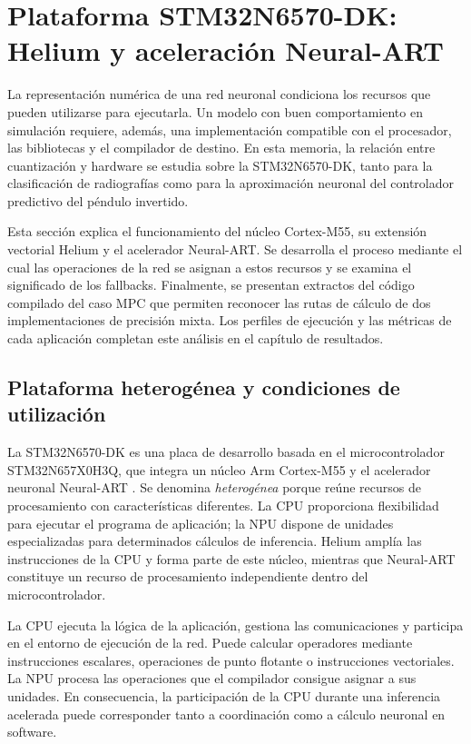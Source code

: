 \section{Plataforma STM32N6570-DK: Helium y aceleración Neural-ART}\label{cap:hw}\label{cap:plataforma}
La representación numérica de una red neuronal condiciona los recursos que pueden utilizarse para ejecutarla. Un modelo con buen comportamiento en simulación requiere, además, una implementación compatible con el procesador, las bibliotecas y el compilador de destino. En esta memoria, la relación entre cuantización y hardware se estudia sobre la STM32N6570-DK, tanto para la clasificación de radiografías como para la aproximación neuronal del controlador predictivo del péndulo invertido.

Esta sección explica el funcionamiento del núcleo Cortex-M55, su extensión vectorial Helium y el acelerador Neural-ART. Se desarrolla el proceso mediante el cual las operaciones de la red se asignan a estos recursos y se examina el significado de los fallbacks. Finalmente, se presentan extractos del código compilado del caso MPC que permiten reconocer las rutas de cálculo de dos implementaciones de precisión mixta. Los perfiles de ejecución y las métricas de cada aplicación completan este análisis en el capítulo de resultados.

\subsection{Plataforma heterogénea y condiciones de utilización}\label{sec:cap4_plataforma}
La STM32N6570-DK es una placa de desarrollo basada en el microcontrolador STM32N657X0H3Q, que integra un núcleo Arm Cortex-M55 y el acelerador neuronal Neural-ART \cite{cap4_board}. Se denomina \emph{heterogénea} porque reúne recursos de procesamiento con características diferentes. La CPU proporciona flexibilidad para ejecutar el programa de aplicación; la NPU dispone de unidades especializadas para determinados cálculos de inferencia. Helium amplía las instrucciones de la CPU y forma parte de este núcleo, mientras que Neural-ART constituye un recurso de procesamiento independiente dentro del microcontrolador.

La CPU ejecuta la lógica de la aplicación, gestiona las comunicaciones y participa en el entorno de ejecución de la red. Puede calcular operadores mediante instrucciones escalares, operaciones de punto flotante o instrucciones vectoriales. La NPU procesa las operaciones que el compilador consigue asignar a sus unidades. En consecuencia, la participación de la CPU durante una inferencia acelerada puede corresponder tanto a coordinación como a cálculo neuronal en software.



